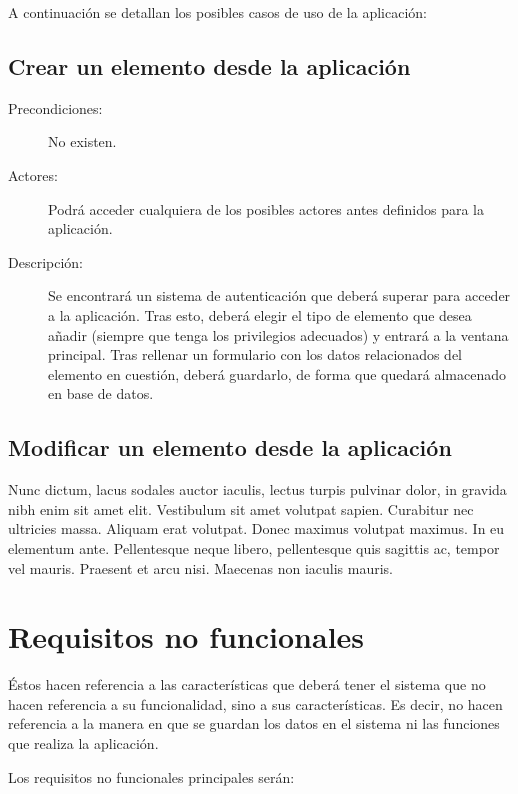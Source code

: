 A continuación se detallan los posibles casos de uso de la aplicación:

\subsection{Crear un elemento desde la aplicación}
\begin{description}
\item [Precondiciones:]No existen.
\item [Actores:]Podrá acceder cualquiera de los posibles actores antes
    definidos para la aplicación.
\item [Descripción:] Se encontrará un sistema de autenticación que deberá
    superar para acceder a la aplicación. Tras esto, deberá elegir el tipo de
    elemento que desea añadir (siempre que tenga los privilegios adecuados) y
    entrará a la ventana principal. Tras rellenar un formulario con los datos
    relacionados del elemento en cuestión, deberá guardarlo, de forma que
    quedará almacenado en base de datos.
\end{description}

\subsection{Modificar un elemento desde la aplicación}

Nunc dictum, lacus sodales auctor iaculis, lectus turpis pulvinar dolor, in
gravida nibh enim sit amet elit. Vestibulum sit amet volutpat sapien. Curabitur
nec ultricies massa. Aliquam erat volutpat. Donec maximus volutpat maximus. In
eu elementum ante. Pellentesque neque libero, pellentesque quis sagittis ac,
tempor vel mauris. Praesent et arcu nisi. Maecenas non iaculis mauris.


\section{Requisitos no funcionales}

Éstos hacen referencia a las características que deberá tener el sistema que no
hacen referencia a su funcionalidad, sino a sus características. Es decir, no
hacen referencia a la manera en que se guardan los datos en el sistema ni las
funciones que realiza la aplicación.

Los requisitos no funcionales principales serán:

